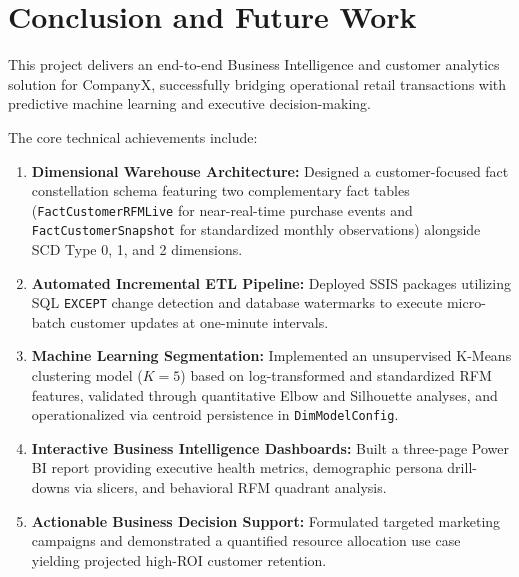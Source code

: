 \chapter{Conclusion and Future Work}
\label{chap:conclusion}

This project delivers an end-to-end Business Intelligence and customer analytics solution for CompanyX, successfully bridging operational retail transactions with predictive machine learning and executive decision-making. 

The core technical achievements include:
\begin{enumerate}
    \item \textbf{Dimensional Warehouse Architecture:} Designed a customer-focused fact constellation schema featuring two complementary fact tables (\texttt{FactCustomerRFMLive} for near-real-time purchase events and \texttt{FactCustomerSnapshot} for standardized monthly observations) alongside SCD Type 0, 1, and 2 dimensions.
    \item \textbf{Automated Incremental ETL Pipeline:} Deployed SSIS packages utilizing SQL \texttt{EXCEPT} change detection and database watermarks to execute micro-batch customer updates at one-minute intervals.
    \item \textbf{Machine Learning Segmentation:} Implemented an unsupervised K-Means clustering model ($K=5$) based on log-transformed and standardized RFM features, validated through quantitative Elbow and Silhouette analyses, and operationalized via centroid persistence in \texttt{DimModelConfig}.
    \item \textbf{Interactive Business Intelligence Dashboards:} Built a three-page Power BI report providing executive health metrics, demographic persona drill-downs via slicers, and behavioral RFM quadrant analysis.
    \item \textbf{Actionable Business Decision Support:} Formulated targeted marketing campaigns and demonstrated a quantified resource allocation use case yielding projected high-ROI customer retention.
\end{enumerate}

